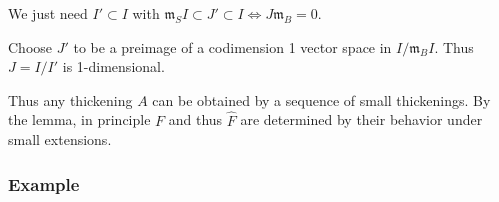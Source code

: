 \begin{center}
  \end{center}

\begin{description}
\tightlist
\item[Proof]
We just need \(I' \subset I\) with
\({\mathfrak{m}}_S I \subset J' \subset I \iff J {\mathfrak{m}}_B = 0\).
\end{description}

Choose \(J'\) to be a preimage of a codimension 1 vector space in
\(I/{\mathfrak{m}}_B I\). Thus \(J = I/I'\) is 1-dimensional.

Thus any thickening \(A\) can be obtained by a sequence of small
thickenings. By the lemma, in principle \(F\) and thus \(\widehat{F}\)
are determined by their behavior under small extensions.

\hypertarget{example}{%
\subsubsection{Example}\label{example}}

